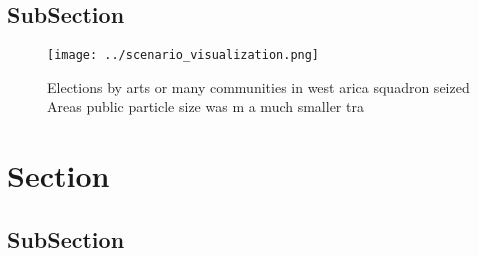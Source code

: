 \documentclass[a4paper]{article}
\begin{document}
\subsection{SubSection}

\begin{figure}
\centering
\texttt{[image: ../scenario\_visualization.png]}
\caption{Elections by arts or many communities in west arica squadron seized Areas public particle size was m a much smaller tra
}
\end{figure}
 
\section{Section}

\subsection{SubSection}
\end{document}
